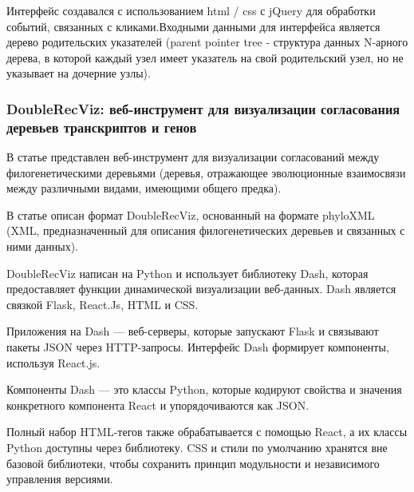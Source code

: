 Интерфейс создавался с использованием html / css с jQuery для обработки событий, связанных с кликами.Входными данными для интерфейса является дерево родительских указателей (parent pointer tree - структура данных N-арного дерева, в которой каждый узел имеет указатель на свой родительский узел, но не указывает на дочерние узлы). 

\subsubsection{DoubleRecViz: веб-инструмент для визуализации согласования деревьев транскриптов и генов \cite{Kuitche2021}}

В статье представлен веб-инструмент для визуализации согласований между филогенетическими деревьями (деревья, отражающее эволюционные взаимосвязи между различными видами, имеющими общего предка).

В статье описан формат DoubleRecViz, основанный на формате phyloXML (XML, предназначенный для описания филогенетических деревьев и связанных с ними данных). 

DoubleRecViz написан на Python и использует библиотеку Dash, которая предоставляет функции динамической визуализации веб-данных.
Dash является связкой Flask, React.Js, HTML и CSS.

Приложения на Dash — веб-серверы, которые запускают Flask и связывают пакеты JSON через HTTP-запросы. Интерфейс Dash формирует компоненты, используя React.js.

Компоненты Dash — это классы Python, которые кодируют свойства и значения конкретного компонента React и упорядочиваются как JSON. 

Полный набор HTML-тегов также обрабатывается с помощью React, а их классы Python доступны через библиотеку. CSS и стили по умолчанию хранятся вне базовой библиотеки, чтобы сохранить принцип модульности и независимого управления версиями.

\noteattributes{}

